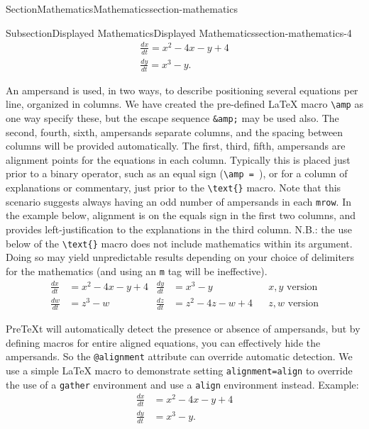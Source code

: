\documentclass[twoside,10pt,]{article}
\newcommand{\mono}[1]{\texttt{#1}}
\numberwithin{equation}{section}
\newcommand{\myequation}[2]{#1\amp =#2}
\newcommand{\amp}{&}
\begin{document}
\begin{sectionptx}{Section}{Mathematics}{}{Mathematics}{}{}{section-mathematics}
\begin{subsectionptx}{Subsection}{Displayed Mathematics}{}{Displayed Mathematics}{}{}{section-mathematics-4}
\begin{gather*}
\frac{dx}{dt} = x^2 - 4x - y + 4\\
\frac{dy}{dt} = x^3 - y.
\end{gather*}
%
\par
An ampersand is used, in two ways, to describe positioning several equations per line, organized in columns.  We have created the pre-defined \LaTeX{} macro \mono{\textbackslash{}amp} as one way specify these, but the escape sequence \mono{\&amp;} may be used also.  The second, fourth, sixth, \textellipsis{} ampersands separate columns, and the spacing between columns will be provided automatically.  The first, third, fifth, \textellipsis{} ampersands are alignment points for the equations in each column.  Typically this is placed just prior to a binary operator, such as an equal sign (\mono{\textbackslash{}amp = }), or for a column of explanations or commentary, just prior to the \mono{\textbackslash{}text\{\}} macro.  Note that this scenario suggests always having an odd number of ampersands in each \mono{mrow}.  In the example below, alignment is on the equals sign in the first two columns, and provides left-justification to the explanations in the third column.  N.B.: the use below of the \mono{\textbackslash{}text\{\}} macro does not include mathematics within its argument.  Doing so may yield unpredictable results depending on your choice of delimiters for the mathematics (and using an \mono{m} tag will be ineffective).%
\begin{align*}
\frac{dx}{dt} \amp = x^2 - 4x - y + 4 \amp \frac{dy}{dt} \amp = x^3 - y          \amp\amp x, y\text{ version}\\
\frac{dw}{dt} \amp = z^3 - w          \amp \frac{dz}{dt} \amp = z^2 - 4z - w + 4 \amp\amp z, w\text{ version}
\end{align*}
%
\par
PreTeXt will automatically detect the presence or absence of ampersands, but by defining macros for entire aligned equations, you can effectively hide the ampersands.  So the \mono{@alignment} attribute can override automatic detection.  We use a simple \LaTeX{} macro to demonstrate setting \mono{alignment=\textquotesingle{}align\textquotesingle{}} to override the use of a \mono{gather} environment and use a \mono{align} environment instead.  Example:%
\begin{align*}
\myequation{\frac{dx}{dt}}{x^2 - 4x - y + 4}\\
\myequation{\frac{dy}{dt}}{x^3 - y}.
\end{align*}

\end{subsectionptx}
\end{sectionptx}
\end{document}
